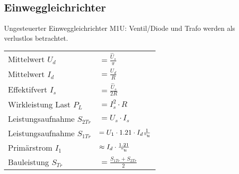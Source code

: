 \subsection{Einweggleichrichter}
\begin{multicols}{2}
Ungesteuerter Einweggleichrichter M1U: \newline
Ventil/Diode und Trafo werden als verlustlos betrachtet.



\renewcommand{\arraystretch}{1.5}
\begin{tabular}{ll}
	Mittelwert $U_d$ 			& $ = \frac{\hat{U}_s}{\pi}$ \\
	Mittelwert $I_d$ 			& $ = \frac{U_d}{R}$ \\
	Effektifvert $I_s$			& $ = \frac{\hat{U}_s}{2R}$ \\
	Wirkleistung Last $P_L$		& $ = I_s^2 \cdot R$ \\
	Leistungsaufnahme $S_{2Tr}$	& $ = U_s \cdot I_s$ \\
	Leistungsaufnahme $S_{1Tr}$	& $ = U_1 \cdot 1.21 \cdot I_d \frac{1}{"u}$ \\
	Primärstrom $I_1$			& $ \approx I_d \cdot \frac{1.21}{"u} $ \\
	Bauleistung $S_{Tr}$		& $ = \frac{S_{1Tr} + S_{2Tr}}{2}$
\end{tabular}
\end{multicols}
